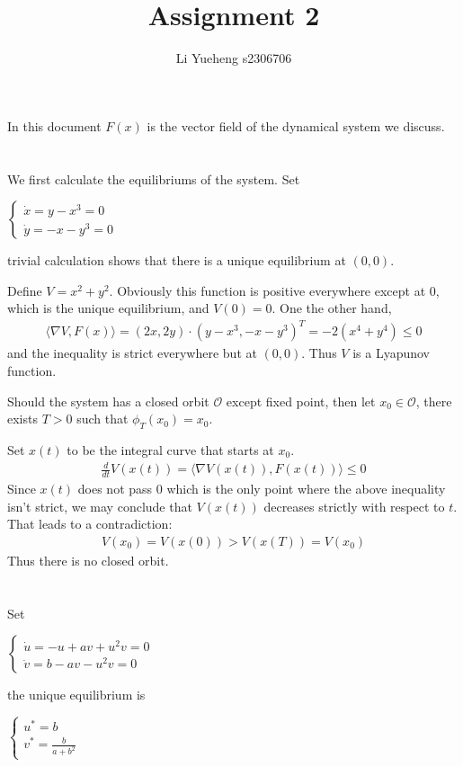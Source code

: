 \documentclass{article}
\begin{document}
\title{Assignment 2}
\author{Li Yueheng s2306706}

\maketitle
In this document $F(x)$ is the vector field of the dynamical system we discuss.
\section{}

We first calculate the equilibriums of the system. Set
\begin{center}
$
	\begin{cases}
		\dot{x}=y-x^3=0 \\
		\dot{y}=-x-y^3=0
	\end{cases}
$
\end{center}
trivial calculation shows that there is a unique equilibrium at $(0,0)$.

Define $V=x^2+y^2$. Obviously this function is positive everywhere except at $0$, which is the unique equilibrium, and $V(0)=0$. One the other hand, 
\begin{align*}
	\langle \nabla V,F(x)\rangle =(2x,2y)\cdot(y-x^3,-x-y^3)^T=-2(x^4+y^4)\leq 0
\end{align*}
and the inequality is strict everywhere but at $(0,0)$. Thus $V$ is a Lyapunov function. 

Should the system has a closed orbit $\mathcal{O}$ except fixed point, then let $x_0 \in \mathcal{O}$, there exists $T>0$ such that $\phi_T(x_0)=x_0$. 

Set $x(t)$ to be the integral curve that starts at $x_0$. 
\begin{align*}
	\frac{d}{dt}V(x(t))=\langle \nabla V(x(t)),F(x(t))\rangle \leq0
\end{align*}
Since $x(t)$ does not pass $0$ which is the only point where the above inequality isn't strict, we may conclude that $V(x(t))$ decreases strictly with respect to $t$. That leads to a contradiction:
\begin{align*}
	V(x_0)=V(x(0))>V(x(T))=V(x_0)
\end{align*}
Thus there is no closed orbit.




\section{}
\subsection{}
Set
\begin{center}
$
	\begin{cases}
	\dot{u}=-u+av+u^2v=0 \\
	\dot{v}=b-av-u^2v=0
\end{cases}
$
\end{center}
the unique equilibrium is 
\begin{center}
$
\begin{cases}
	u^*=b \\
	v^*=\frac{b}{a+b^2}
\end{cases}
$
\end{center}
\end{document}

